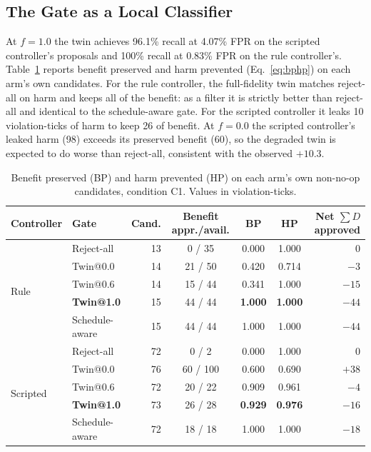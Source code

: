 \documentclass[conference]{IEEEtran}
\begin{document}
\subsection{The Gate as a Local Classifier}

At $f = 1.0$ the twin achieves 96.1\% recall at 4.07\% FPR on the scripted controller's proposals and 100\% recall at 0.83\% FPR on the rule controller's. Table~\ref{tab:bphp} reports benefit preserved and harm prevented (Eq.~\eqref{eq:bphp}) on each arm's own candidates. For the rule controller, the full-fidelity twin matches reject-all on harm and keeps all of the benefit: as a filter it is strictly better than reject-all and identical to the schedule-aware gate. For the scripted controller it leaks 10 violation-ticks of harm to keep 26 of benefit. At $f = 0.0$ the scripted controller's leaked harm (98) exceeds its preserved benefit (60), so the degraded twin is expected to do worse than reject-all, consistent with the observed $+10.3$.

\begin{table}[t]
\centering
\caption{Benefit preserved (BP) and harm prevented (HP) on each arm's own non-no-op candidates, condition C1. Values in violation-ticks.}
\label{tab:bphp}
\small
\setlength{\tabcolsep}{4.5pt}
\begin{tabular}{@{}llrcccr@{}}
\toprule
Controller & Gate & Cand. & Benefit appr./avail. & BP & HP & Net $\sum D$ approved \\
\midrule
\multirow{5}{*}{Rule}
 & Reject-all     & 13 & 0 / 35  & 0.000 & 1.000 & 0 \\
 & Twin@0.0       & 14 & 21 / 50 & 0.420 & 0.714 & $-3$ \\
 & Twin@0.6       & 14 & 15 / 44 & 0.341 & 1.000 & $-15$ \\
 & \textbf{Twin@1.0} & 15 & 44 / 44 & \textbf{1.000} & \textbf{1.000} & $-44$ \\
 & Schedule-aware & 15 & 44 / 44 & 1.000 & 1.000 & $-44$ \\
\midrule
\multirow{5}{*}{Scripted}
 & Reject-all     & 72 & 0 / 2    & 0.000 & 1.000 & 0 \\
 & Twin@0.0       & 76 & 60 / 100 & 0.600 & 0.690 & $+38$ \\
 & Twin@0.6       & 72 & 20 / 22  & 0.909 & 0.961 & $-4$ \\
 & \textbf{Twin@1.0} & 73 & 26 / 28 & \textbf{0.929} & \textbf{0.976} & $-16$ \\
 & Schedule-aware & 72 & 18 / 18  & 1.000 & 1.000 & $-18$ \\
\bottomrule
\end{tabular}
\end{table}
\end{document}

